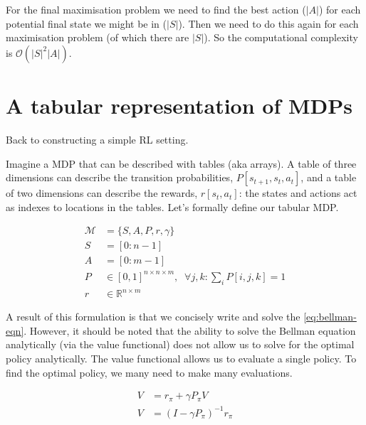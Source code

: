 
For the final maximisation problem we need to find the best action ($|A|$) for each potential final state we might be in ($|S|$).
Then we need to do this again for each maximisation problem (of which there are $|S|$).
So the computational complexity is $\mathcal O(|S|^2|A|)$.

\section{A tabular representation of MDPs}

Back to constructing a simple RL setting.

Imagine a MDP that can be described with tables (aka arrays). A table of
three dimensions can describe the transition probabilities, $P[s_{t+1}, s_t, a_t]$,
and a table of two dimensions can describe the rewards, $r[s_t, a_t]$: the
states and actions act as indexes to locations in the tables.
Let's formally define our tabular MDP. \footnotemark[23]


\begin{align}
\mathcal M &= \{S, A, P, r, \gamma\}\; \tag{the MDP}\\
S &= [0:n-1] \tag{the state space}\\
A &= [0:m-1] \tag{the action space}\\
P &\in [0,1]^{n\times n \times m}, \;\;\forall j, k : \sum_i P[i, j, k] = 1 \tag{the transition fn}\\
r &\in \mathbb R^{n\times m} \tag{the reward fn}
\end{align}

A result of this formulation is that we concisely write and solve the \eqref{eq:bellman-eqn}.
However, it should be noted that the ability to solve the Bellman equation analytically (via the value functional)
does not allow us to solve for the optimal policy analytically. The value functional allows us to evaluate a single policy.
To find the optimal policy, we many need to make many evaluations.

\begin{align}
V &= r_{\pi} + \gamma P_{\pi} V \tag{tabular Bellman eqn}\\
V &= (I-\gamma P_{\pi})^{-1}r_{\pi}  \label{eq:value-functional}\tag{Value functional}
\end{align}

